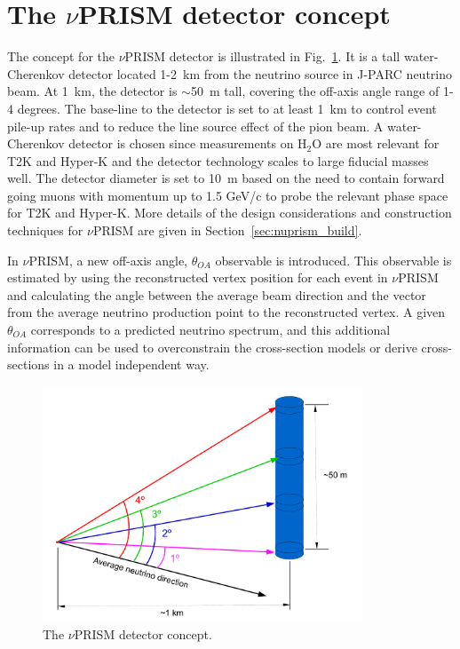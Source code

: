 \section{The $\nu$PRISM detector concept \label{sec:nuprism}}


The concept for the $\nu$PRISM detector is illustrated in Fig.~\ref{fig:nuprism_concept}.  It is a tall water-Cherenkov 
detector located 1-2~km from the neutrino source in J-PARC neutrino beam.  At 1~km, the detector is $\sim$50~m tall, covering
the off-axis angle range of 1-4 degrees. The base-line to the detector is set to at least 1~km to control event pile-up rates
and to reduce the line source effect of the pion beam.  A water-Cherenkov detector is chosen since measurements on H$_{2}$O are
most relevant for T2K and Hyper-K and the detector technology scales to large fiducial masses well.  The detector diameter is 
set to 10~m based on the need to contain forward going muons with momentum up to 1.5 GeV/c to probe the relevant phase space for
T2K and Hyper-K.  More details of the design considerations and construction techniques for $\nu$PRISM are given in 
Section~\ref{sec:nuprism_build}.

In $\nu$PRISM, a new off-axis angle, $\theta_{OA}$ observable is introduced.  This observable is estimated by using the reconstructed
vertex position for each event in $\nu$PRISM and calculating the angle between the average beam direction and the vector from the 
average neutrino production point to the reconstructed vertex.  A given $\theta_{OA}$ corresponds to a predicted neutrino spectrum,
and this additional information can be used to overconstrain the cross-section models or derive cross-sections in a model independent
way.

\begin{figure}
 \begin{center}
  \includegraphics[width=0.85\textwidth]{figures/nuprism_schematic.pdf}
  \caption{The $\nu$PRISM detector concept.}
  \label{fig:nuprism_concept}
  \end{center}
\end{figure}

